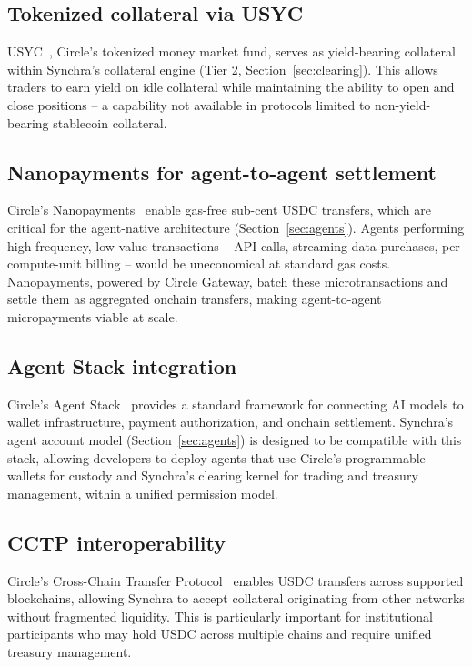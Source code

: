 \documentclass[11pt,a4paper]{article}
\begin{document}
\subsection{Tokenized collateral via USYC}

USYC~\cite{circle_usyc}, Circle's tokenized money market fund, serves as yield-bearing collateral within Synchra's collateral engine (Tier 2, Section~\ref{sec:clearing}). This allows traders to earn yield on idle collateral while maintaining the ability to open and close positions -- a capability not available in protocols limited to non-yield-bearing stablecoin collateral.

\subsection{Nanopayments for agent-to-agent settlement}

Circle's Nanopayments~\cite{circle_nanopayments} enable gas-free sub-cent USDC transfers, which are critical for the agent-native architecture (Section~\ref{sec:agents}). Agents performing high-frequency, low-value transactions -- API calls, streaming data purchases, per-compute-unit billing -- would be uneconomical at standard gas costs. Nanopayments, powered by Circle Gateway, batch these microtransactions and settle them as aggregated onchain transfers, making agent-to-agent micropayments viable at scale.

\subsection{Agent Stack integration}

Circle's Agent Stack~\cite{circle_agent_stack} provides a standard framework for connecting AI models to wallet infrastructure, payment authorization, and onchain settlement. Synchra's agent account model (Section~\ref{sec:agents}) is designed to be compatible with this stack, allowing developers to deploy agents that use Circle's programmable wallets for custody and Synchra's clearing kernel for trading and treasury management, within a unified permission model.

\subsection{CCTP interoperability}

Circle's Cross-Chain Transfer Protocol~\cite{cctp} enables USDC transfers across supported blockchains, allowing Synchra to accept collateral originating from other networks without fragmented liquidity. This is particularly important for institutional participants who may hold USDC across multiple chains and require unified treasury management.
\end{document}
